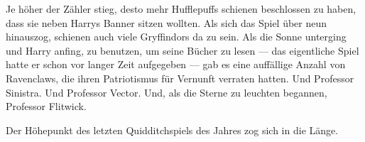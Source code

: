 




Je höher der Zähler stieg, desto mehr Hufflepuffs schienen beschlossen zu haben, dass sie neben Harrys Banner sitzen wollten. Als sich das Spiel über neun hinauszog, schienen auch viele Gryffindors da zu sein. Als die Sonne unterging und Harry anfing,  zu benutzen, um seine Bücher zu lesen — das eigentliche Spiel hatte er schon vor langer Zeit aufgegeben — gab es eine auffällige Anzahl von Ravenclaws, die ihren Patriotismus für Vernunft verraten hatten. Und Professor Sinistra. Und Professor Vector. Und, als die Sterne zu leuchten begannen, Professor Flitwick.

Der Höhepunkt des letzten Quidditchspiels des Jahres zog sich in die Länge.

\later

